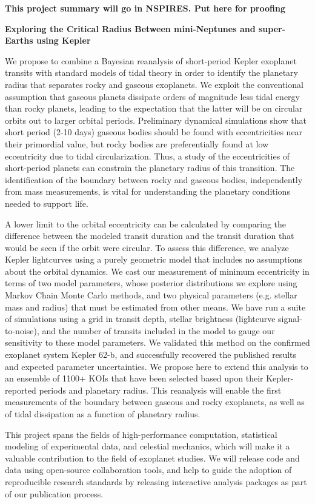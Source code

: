 \centerline{\bf This project summary will go in NSPIRES.  Put here for proofing} \medskip

\centerline{\bf Exploring the Critical Radius Between mini-Neptunes and super-Earths using Kepler} \medskip

We propose to combine a Bayesian reanalysis of short-period Kepler exoplanet transits with standard models of tidal theory in order to identify the planetary radius that separates rocky and gaseous exoplanets. We exploit the conventional assumption that gaseous planets dissipate orders of magnitude less tidal energy than rocky planets, leading to the expectation that the latter will be on circular orbits out to larger orbital periods. Preliminary dynamical simulations show that short period (2-10 days) gaseous bodies should be found with eccentricities near their primordial value, but rocky bodies are preferentially found at low eccentricity due to tidal circularization.  Thus, a study of the eccentricities of short-period planets can constrain the planetary radius of this transition.  The identification of the boundary between rocky and gaseous bodies, independently from mass measurements, is vital for understanding the planetary conditions needed to support life.

A lower limit to the orbital eccentricity can be calculated by comparing the difference between the modeled transit duration and the transit duration that would be seen if the orbit were circular.  To assess this difference, we analyze Kepler lightcurves using a purely geometric model that includes no assumptions about the orbital dynamics.  We cast our measurement of minimum eccentricity in terms of two model parameters, whose posterior distributions we explore using Markov Chain Monte Carlo methods, and two physical parameters (e.g. stellar mass and radius) that must be estimated from other means.  We have run a suite of simulations using a grid in transit depth, stellar brightness (lightcurve signal-to-noise), and the number of transits included in the model to gauge our sensitivity to these model parameters.  We validated this method on the confirmed exoplanet system Kepler 62-b, and successfully recovered the published results and expected parameter uncertainties. We propose here to extend this analysis to an ensemble of 1100+ KOIs that have been selected based upon their Kepler-reported periods and planetary radius.  This reanalysis will enable the first measurements of the boundary between gaseous and rocky exoplanets, as well as of tidal dissipation as a function of planetary radius.

This project spans the fields of high-performance computation, statistical modeling of experimental data, and celestial mechanics, which will make it a valuable contribution to the field of exoplanet studies.  We will release code and data using open-source collaboration tools, and help to guide the adoption of reproducible research standards by releasing interactive analysis packages as part of our publication process.

